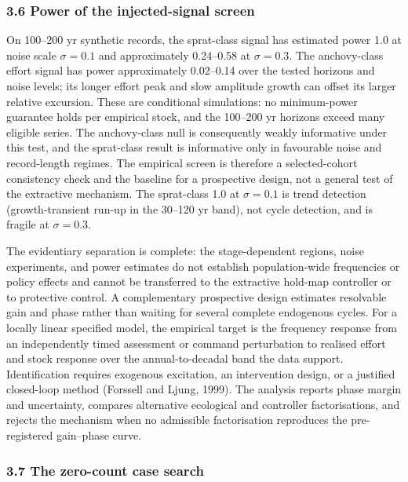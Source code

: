 \documentclass[11pt]{article}
\begin{document}
\subsubsection{3.6 Power of the injected-signal
screen}\label{power-of-the-injected-signal-screen}

On 100--200 yr synthetic records, the sprat-class signal has estimated
power 1.0 at noise scale \(\sigma=0.1\) and approximately 0.24--0.58 at
\(\sigma=0.3\). The anchovy-class effort signal has power approximately
0.02--0.14 over the tested horizons and noise levels; its longer effort
peak and slow amplitude growth can offset its larger relative excursion.
These are conditional simulations: no minimum-power guarantee holds per
empirical stock, and the 100--200 yr horizons exceed many eligible
series. The anchovy-class null is consequently weakly informative under
this test, and the sprat-class result is informative only in
favourable noise and record-length regimes. The empirical screen is
therefore a selected-cohort consistency check and the baseline for a
prospective design, not a general test of the extractive mechanism. The sprat-class 1.0 at \(\sigma=0.1\) is trend detection (growth-transient run-up in the 30--120 yr band), not cycle detection, and is fragile at \(\sigma=0.3\).

The evidentiary separation is complete: the stage-dependent regions, noise
experiments, and power estimates do not establish population-wide
frequencies or policy effects and cannot be transferred to the
extractive hold-map controller or to protective control. A complementary
prospective design estimates resolvable gain and phase rather than
waiting for several complete endogenous cycles. For a locally linear
specified model, the empirical target is the frequency response from an
independently timed assessment or command perturbation to realised
effort and stock response over the annual-to-decadal band the data
support. Identification requires exogenous excitation, an intervention
design, or a justified closed-loop method (Forssell and Ljung, 1999).
The analysis reports phase margin and uncertainty, compares alternative
ecological and controller factorisations, and rejects the mechanism when
no admissible factorisation reproduces the pre-registered gain--phase
curve.

\subsubsection{3.7 The zero-count case
search}\label{the-zero-count-case-search}
\end{document}
